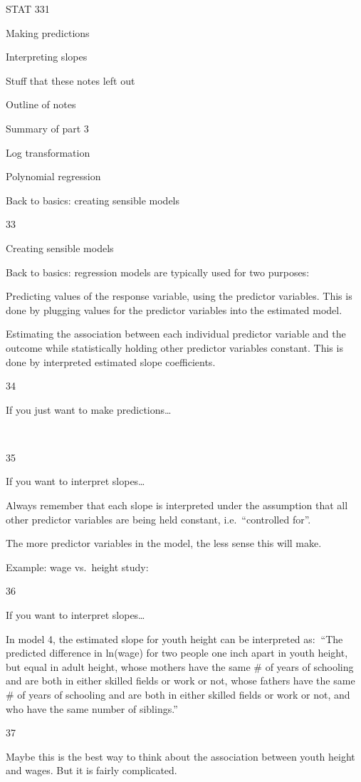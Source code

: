\documentclass[
  letterpaper,
  DIV=11,
  numbers=noendperiod]{scrreprt}
\begin{document}
STAT 331

Making predictions

Interpreting slopes

Stuff that these notes left out

Outline of notes

Summary of part 3

Log transformation

Polynomial regression

Back to basics: creating sensible models

33

Creating sensible models

Back to basics: regression models are typically used for two purposes:

Predicting values of the response variable, using the predictor
variables. This is done by plugging values for the predictor variables
into the estimated model.

Estimating the association between each individual predictor variable
and the outcome while statistically holding other predictor variables
constant. This is done by interpreted estimated slope coefficients.

34

If you just want to make predictions\ldots{}

~

35

If you want to interpret slopes\ldots{}

Always remember that each slope is interpreted under the assumption that
all other predictor variables are being held constant, i.e.~``controlled
for''.

The more predictor variables in the model, the less sense this will
make.

Example: wage vs.~height study:

36

If you want to interpret slopes\ldots{}

In model 4, the estimated slope for youth height can be interpreted
as:``The predicted difference in ln(wage) for two people one inch apart
in youth height, but equal in adult height, whose mothers have the same
\# of years of schooling and are both in either skilled fields or work
or not, whose fathers have the same \# of years of schooling and are
both in either skilled fields or work or not, and who have the same
number of siblings.''

37

Maybe this is the best way to think about the association between youth
height and wages. But it is fairly complicated.
\end{document}

